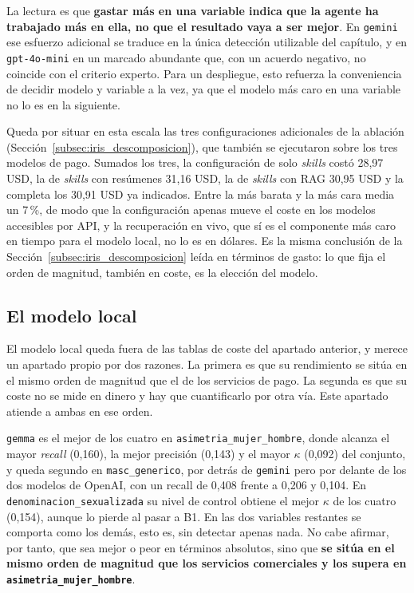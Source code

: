 La lectura es que \textbf{gastar más en una variable indica que la agente ha
trabajado más en ella, no que el resultado vaya a ser mejor}. En \texttt{gemini} ese
esfuerzo adicional se traduce en la única detección utilizable del capítulo, y en
\texttt{gpt-4o-mini} en un marcado abundante que, con un acuerdo negativo, no
coincide con el criterio experto. Para un despliegue, esto refuerza la conveniencia de decidir modelo y variable a la
vez, ya que el modelo más caro en una variable no lo es en la siguiente.

Queda por situar en esta escala las tres configuraciones adicionales de la ablación
(Sección~\ref{subsec:iris_descomposicion}), que también se ejecutaron sobre los tres
modelos de pago. Sumados los tres, la configuración de solo \textit{skills} costó
28,97 USD, la de \textit{skills} con resúmenes 31,16 USD, la de \textit{skills} con
RAG 30,95 USD y la completa los 30,91 USD ya indicados. Entre la más barata y la más
cara media un 7\,\%, de modo que la configuración apenas mueve el coste en los
modelos accesibles por API, y la recuperación en vivo, que sí es el componente más
caro en tiempo para el modelo local, no lo es en dólares. Es la misma conclusión de
la Sección~\ref{subsec:iris_descomposicion} leída en términos de gasto: lo que fija
el orden de magnitud, también en coste, es la elección del modelo.

\subsection{El modelo local}

El modelo local queda fuera de las tablas de coste del apartado anterior, y merece un
apartado propio por dos razones. La primera es que su rendimiento se sitúa en el
mismo orden de magnitud que el de los servicios de pago. La
segunda es que su coste no se mide en dinero y hay que cuantificarlo por otra vía.
Este apartado atiende a ambas en ese orden.

\texttt{gemma} es el mejor de los cuatro en \texttt{asimetria\_mujer\_hombre}, donde
alcanza el mayor \textit{recall} (0,160), la mejor
precisión (0,143) y el mayor $\kappa$ (0,092) del conjunto, y queda segundo en
\texttt{masc\_generico}, por detrás de \texttt{gemini} pero por delante de los dos
modelos de OpenAI, con un recall de 0,408 frente a 0,206 y 0,104. En
\texttt{denominacion\_sexualizada} su nivel de control obtiene el mejor $\kappa$ de
los cuatro (0,154), aunque lo pierde al pasar a B1. En las dos variables restantes
se comporta como los demás, esto es, sin detectar apenas nada. No cabe afirmar, por
tanto, que sea mejor o peor en términos absolutos, sino que \textbf{se sitúa en el mismo
orden de magnitud que los servicios comerciales y los supera en
\texttt{asimetria\_mujer\_hombre}}.

